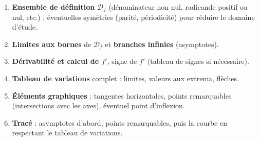 \documentclass[11pt]{article}
\newcommand{\cle}[1]{{\popxbold\color{popdark}#1}}
\begin{document}
\begin{methode}
\begin{enumerate}
\item \textbf{Ensemble de définition} $\mathcal{D}_f$ (dénominateur non nul, radicande positif ou nul, etc.) ; éventuelles symétries (parité, périodicité) pour \cle{réduire le domaine d'étude}.
\item \textbf{Limites aux bornes} de $\mathcal{D}_f$ et \textbf{branches infinies} (asymptotes).
\item \textbf{Dérivabilité et calcul de $f'$}, signe de $f'$ (tableau de signes si nécessaire).
\item \textbf{Tableau de variations} complet : limites, valeurs aux extrema, flèches.
\item \textbf{Éléments graphiques} : tangentes horizontales, points remarquables (intersections avec les axes), éventuel point d'inflexion.
\item \textbf{Tracé} : asymptotes d'abord, points remarquables, puis la courbe en respectant le tableau de variations.
\end{enumerate}
\end{methode}
\end{document}
